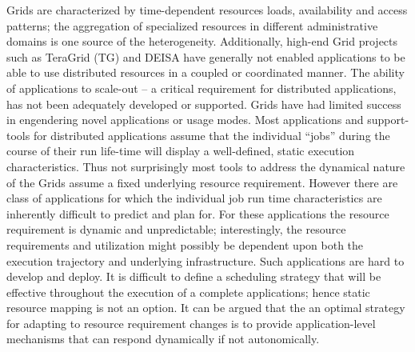 \documentclass{sig-alternate}
\newcommand{\jhanote}[1]{ {\textcolor{red} { ***Jha: #1 }}}
\newcommand{\yyenote}[1]{ {\textcolor{blue} { ***yye00: #1 }}}
\newcommand{\jhanote}[1]{}
\newcommand{\yyenote}[1]{}
\begin{document}

Grids are characterized by time-dependent resources loads, availability and access patterns; the aggregation of specialized resources in different administrative domains is one source of the heterogeneity.  Additionally, high-end Grid projects such as TeraGrid (TG) and DEISA have generally not enabled applications to be able to use distributed resources in a coupled or coordinated manner. The ability of applications to scale-out -- a critical requirement for distributed applications, has not been adequately developed or supported. Grids have had limited success in engendering novel applications or usage modes.  Most applications and support-tools for distributed applications assume that the individual ``jobs'' during the course of their run life-time will display a well-defined, static execution characteristics.  Thus not surprisingly most tools to address the dynamical nature of the Grids assume a fixed underlying resource requirement.  However there are class of applications for which the individual job run time characteristics are inherently difficult to predict and plan for. For these applications the resource requirement is dynamic and unpredictable; interestingly, the resource requirements and utilization might possibly be dependent upon both the execution trajectory and underlying infrastructure. Such applications are hard to develop and deploy. It is difficult to define a scheduling strategy that will be effective throughout the execution of a complete applications; hence static resource mapping is not an option.  It can be argued that the an optimal strategy for adapting to resource requirement changes is to provide application-level mechanisms that can respond dynamically if not autonomically.

\end{document}
